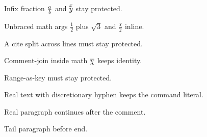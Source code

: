 \documentclass[11pt]{article}
\begin{document}
Infix fraction ${a\over b}$ and $\buildrel x \over y$ stay protected.

Unbraced math args $\frac 12$ plus $\sqrt3$ and $\frac\chi2$ inline.

A cite split across lines \cite
{vaswani2017} must stay protected.

Comment-join inside math $\overline{%
\chi}$ keeps identity.

Range-as-key \cite{a-b} must stay protected.

Real text with dis\-cretionary hyphen keeps the command literal.

Real paragraph continues after the comment.


\begin {abstract}
Spaced env-tag body must still parse as abstract content.
\end {abstract}

Tail paragraph before end.
\end{document}
